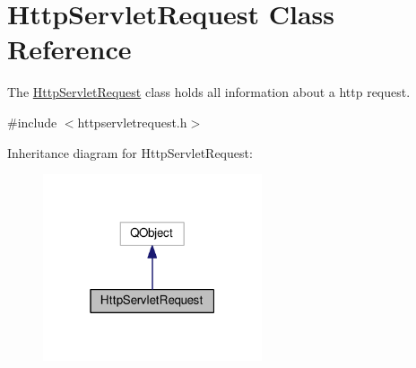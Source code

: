 \hypertarget{class_http_servlet_request}{}\section{Http\+Servlet\+Request Class Reference}
\label{class_http_servlet_request}


The \hyperlink{class_http_servlet_request}{Http\+Servlet\+Request} class holds all information about a http request.  




{\ttfamily \#include $<$httpservletrequest.\+h$>$}



Inheritance diagram for Http\+Servlet\+Request\+:\nopagebreak
\begin{figure}[H]
\begin{center}
\leavevmode
\includegraphics[width=183pt]{class_http_servlet_request__inherit__graph}
\end{center}
\end{figure}
